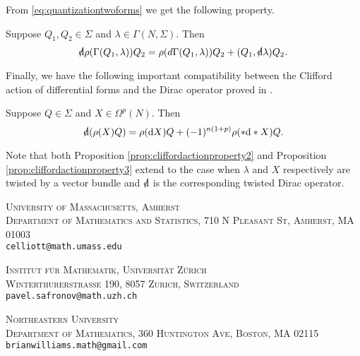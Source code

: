 \documentclass[10pt, oneside]{article}
\begin{document}
From \eqref{eq:quantizationtwoforms} we get the following property.

\begin{prop}
Suppose $Q_1,Q_2\in\Sigma$ and $\lambda\in\Gamma(N, \Sigma)$. Then
\[\sd{\d}\rho(\Gamma(Q_1, \lambda)) Q_2 = \rho(d \Gamma(Q_1, \lambda)) Q_2 + (Q_1, \sd{\d} \lambda) Q_2.\]
\label{prop:cliffordactionproperty2}
\end{prop}

Finally, we have the following important compatibility between the Clifford action of differential forms and the Dirac operator proved in \cite[equation 7.6]{Snygg}.

\begin{prop}
Suppose $Q\in\Sigma$ and $X\in\Omega^p(N)$. Then
\[\sd{\d}(\rho(X) Q) = \rho(\d X)Q + (-1)^{n(1+p)}\rho(\ast \d\ast X) Q.\]
\label{prop:cliffordactionproperty3}
\end{prop}

Note that both Proposition \ref{prop:cliffordactionproperty2} and Proposition \ref{prop:cliffordactionproperty3} extend to the case when $\lambda$ and $X$ respectively are twisted by a vector bundle and $\sd{\d}$ is the corresponding twisted Dirac operator.

\pagestyle{bib}
\printbibliography

\textsc{University of Massachusetts, Amherst}\\
\textsc{Department of Mathematics and Statistics, 710 N Pleasant St, Amherst, MA 01003}\\
\texttt{celliott@math.umass.edu}\\
\vspace{-5pt}

\textsc{Institut f\"ur Mathematik, Universit\"at Z\"urich}\\
\textsc{Winterthurerstrasse 190, 8057 Zurich, Switzerland}\\
\texttt{pavel.safronov@math.uzh.ch}\\
\vspace{-5pt}

\textsc{Northeastern University}\\
\textsc{Department of Mathematics, 360 Huntington Ave, Boston, MA 02115}\\
\texttt{brianwilliams.math@gmail.com}\\
\end{document}

